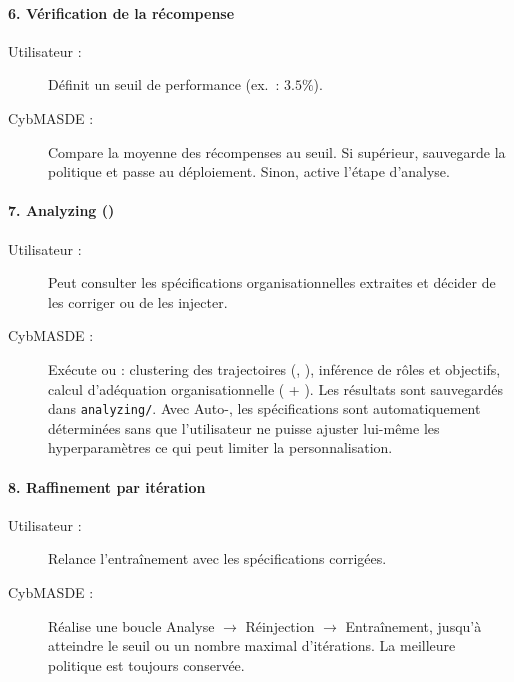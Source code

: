 \paragraph{6. Vérification de la récompense}
\begin{description}
  \item[Utilisateur :] Définit un seuil de performance (ex.~: $3.5\%$).
  \item[CybMASDE :] Compare la moyenne des récompenses au seuil. Si supérieur, sauvegarde la politique et passe au déploiement. Sinon, active l’étape d’analyse.
\end{description}

\paragraph{7. Analyzing ()}
\begin{description}
  \item[Utilisateur :] Peut consulter les spécifications organisationnelles extraites et décider de les corriger ou de les injecter.
  \item[CybMASDE :] Exécute  ou  : clustering des trajectoires (, ), inférence de rôles et objectifs, calcul d’adéquation organisationnelle ( + ). Les résultats sont sauvegardés dans \texttt{analyzing/}. Avec Auto-, les spécifications sont automatiquement déterminées sans que l'utilisateur ne puisse ajuster lui-même les hyperparamètres ce qui peut limiter la personnalisation.
\end{description}

\paragraph{8. Raffinement par itération}
\begin{description}
  \item[Utilisateur :] Relance l’entraînement avec les spécifications corrigées.
  \item[CybMASDE :] Réalise une boucle Analyse $\rightarrow$ Réinjection $\rightarrow$ Entraînement, jusqu’à atteindre le seuil ou un nombre maximal d’itérations. La meilleure politique est toujours conservée.
\end{description}

